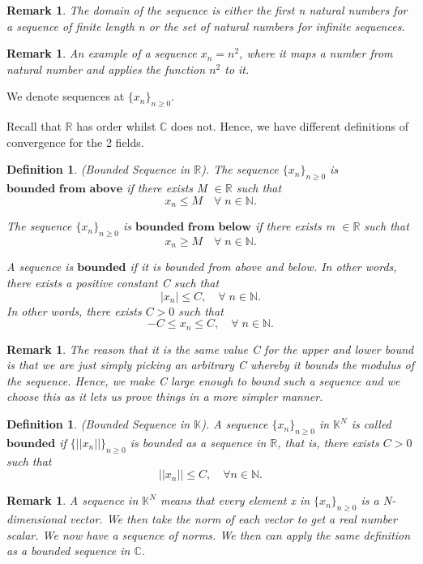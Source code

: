 \documentclass[twoside]{article}
\newtheorem{remark}[theorem]{Remark}
\newtheorem{definition}[theorem]{Definition}
\newcommand{\seq}{\{x_n\}_{n \geq 0}}
\begin{document}
\begin{remark}
The domain of the sequence is either the first n natural numbers for a sequence of finite length n or the set of natural numbers for infinite sequences.
\end{remark}

\begin{remark}
An example of a sequence $x_n = n^2$, where it maps a number from natural number and applies the function $n^2$ to it.
\end{remark}

We denote sequences at $\{x_n\}_{n \geq 0}$.

Recall that $\mathbb{R}$ has order whilst $\mathbb{C}$ does not. Hence, we have different definitions of convergence for the 2 fields.

\begin{definition}
(Bounded Sequence in $\mathbb{R}$). The sequence $\{x_n\}_{n \geq 0}$ is $\textbf{bounded from above}$ if there exists M $\in \mathbb{R}$ such that
$$
x_n \leq M \quad \forall \; n \in \mathbb{N}.
$$

The sequence $\{x_n\}_{n \geq 0}$ is $\textbf{bounded from below}$ if there exists m $\in \mathbb{R}$ such that
$$
x_n \geq M \quad \forall \; n \in \mathbb{N}.
$$

A sequence is $\textbf{bounded}$ if it is bounded from above and below. In other words, there exists a positive constant C such that
$$
|x_n| \leq C, \quad \forall \; n \in \mathbb{N}.
$$
In other words, there exists $C > 0$ such that
$$
-C \leq x_n \leq C, \quad \forall \; n \in \mathbb{N}.
$$
\end{definition}

\begin{remark}
The reason that it is the same value C for the upper and lower bound is that we are just simply picking an arbitrary C whereby it bounds the modulus of the sequence. Hence, we make C large enough to bound such a sequence and we choose this as it lets us prove things in a more simpler manner.
\end{remark}

\begin{definition}
(Bounded Sequence in $\mathbb{K}$). A sequence $\seq$ in $\mathbb{K}^N$ is called $\textbf{bounded}$ if $\{||x_n||\}_{n \geq 0}$ is bounded as a sequence in $\mathbb{R}$, that is, there exists $C > 0$ such that
$$
||x_n|| \leq C, \quad \forall n \in \mathbb{N}.
$$
\end{definition}

\begin{remark}
A sequence in $\mathbb{K}^N$ means that every element x in $\seq$ is a N-dimensional vector. We then take the norm of each vector to get a real number scalar. We now have a sequence of norms. We then can apply the same definition as a bounded sequence in $\mathbb{C}$.
\end{remark}
\end{document}
